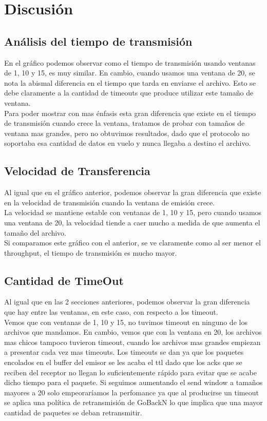 \newpage
\section{Discusión}
\subsection{Análisis del tiempo de transmisión}
\indent En el gráfico podemos observar como el tiempo de transmisión usando
ventanas de 1, 10 y 15, es muy similar. En cambio, cuando usamos una ventana de
20, se nota la abismal diferencia en el tiempo que tarda en enviarse el
archivo. Esto se debe claramente a la cantidad de timeouts que produce utilizar este tamaño de ventana.\\
\indent Para poder mostrar con mas énfasis esta gran diferencia que existe en el
tiempo de transmisión cuando crece la ventana, tratamos de probar con tamaños de
ventana mas grandes, pero no obtuvimos resultados, dado que el protocolo no
soportaba esa cantidad de datos en vuelo y nunca llegaba a destino el archivo.\\

\subsection{Velocidad de Transferencia}
\indent Al igual que en el gráfico anterior, podemos observar la gran diferencia
que existe en la velocidad de transmisión cuando la ventana de emisión crece.\\
\indent La velocidad se mantiene estable con ventanas de 1,
10 y 15, pero cuando usamos una ventana de 20, la velocidad
tiende a caer mucho a medida de que aumenta el tamaño del archivo.\\
\indent Si comparamos este gráfico con el anterior, se ve claramente como al
ser menor el throughput, el tiempo de transmisión es mucho mayor.\\

\subsection{Cantidad de TimeOut}
\indent Al igual que en las 2 secciones anteriores, podemos observar la gran
diferencia que hay entre las ventanas, en este caso, con respecto a los
timeout.\\
\indent Vemos que con ventanas de 1, 10 y 15, no tuvimos timeout en ninguno de
los archivos que mandamos. En cambio, vemos que con la ventana en 20, los
archivos mas chicos tampoco tuvieron timeout, cuando los archivos mas grandes
empiezan a presentar cada vez mas timeouts. Los timeouts se dan ya que los paquetes encolados en el buffer del emisor se les acaba el ttl dado que los acks que se reciben del receptor no llegan lo suficientemente rápido para evitar que se acabe dicho tiempo para el paquete. Si seguimos aumentando el send window a tamaños mayores a 20 solo empeoraríamos la perfomance ya que al producirse un timeout se aplica una política de retransmisión de GoBackN lo que implica que una mayor cantidad de paquetes se deban retransmitir.